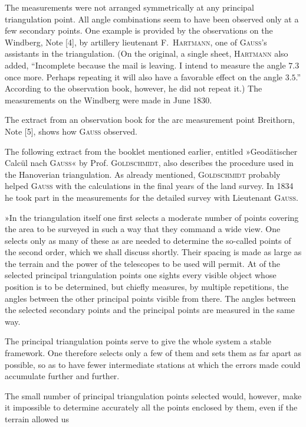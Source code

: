 The measurements were not arranged symmetrically at any principal triangulation point. All angle combinations seem to have been observed only at a few secondary points. One example is provided by the observations on the Windberg, Note [4], by artillery lieutenant F.~\textsc{Hartmann}, one of \textsc{Gauss}'s assistants in the triangulation. (On the original, a single sheet, \textsc{Hartmann} also added, “Incomplete because the mail is leaving. I intend to measure the angle \(7.3\) once more. Perhaps repeating it will also have a favorable effect on the angle \(3.5\).” According to the observation book, however, he did not repeat it.) The measurements on the Windberg were made in June 1830.

The extract from an observation book for the arc measurement point Breithorn, Note [5], shows how \textsc{Gauss} observed.

The following extract from the booklet mentioned earlier, entitled »Geodätischer Calcül nach \textsc{Gauss}« by Prof. \textsc{Goldschmidt}, also describes the procedure used in the Hanoverian triangulation. As already mentioned, \textsc{Goldschmidt} probably helped \textsc{Gauss} with the calculations in the final years of the land survey. In 1834 he took part in the measurements for the detailed survey with Lieutenant \textsc{Gauss}.

»In the triangulation itself one first selects a moderate number of points covering the area to be surveyed in such a way that they command a wide view. One selects only as many of these  as are needed to determine the so-called points of the second order, which we shall discuss shortly. Their spacing is made as large as the terrain and the power of the telescopes to be used will permit. At  of the selected principal triangulation points one sights every visible object whose position is to be determined, but chiefly measures, by multiple repetitions, the angles between the other principal points visible from there. The angles between the selected secondary points and the principal points are measured in the same way.

The principal triangulation points serve to give the whole system a stable framework. One therefore selects only a few of them and sets them as far apart as possible, so as to have fewer intermediate stations at which the errors made could accumulate further and further.

The small number of principal triangulation points selected would, however, make it impossible to determine accurately all the points enclosed by them, even if the terrain allowed us


